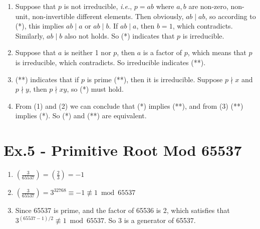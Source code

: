 \documentclass[12pt]{article}
\begin{document}
	\begin{enumerate}
		\item
			Suppose that $p$ is not irreducible, \textit{i.e.}, $p=ab$ where $a,b$ are non-zero, non-unit, non-invertible different elements. Then obviously, $ab\mid ab$, so according to (*), this implies $ab\mid a$ or $ab \mid b$. If $ab \mid a$, then $b=1$, which contradicts. Similarly, $ab \mid b$ also not holds. So (*) indicates that $p$ is irreducible.
		\item
			Suppose that $a$ is neither 1 nor $p$, then $a$ is a factor of $p$, which means that $p$ is irreducible, which contradicts. So irreducible indicates (**).
		\item
			(**) indicates that if $p$ is prime (**), then it is irreducible. Suppose $p\nmid x$ and $p\nmid y$, then $p\nmid xy$, so (*) must hold.
		\item
			From (1) and (2) we can conclude that (*) implies (**), and from (3) (**) implies (*). So (*) and (**) are equivalent.
	\end{enumerate}

\section*{Ex.5 - Primitive Root Mod 65537}

	\begin{enumerate}
		\item
			$(\frac{3}{65537})=(\frac{2}{3})=-1$
		\item
			$(\frac{3}{65537})=3^{32768}\equiv-1\not\equiv1\bmod65537$
		\item
			Since 65537 is prime, and the factor of 65536 is 2, which satisfies that $3^{(65537-1)/2}\not\equiv1\bmod65537$. So 3 is a generator of 65537.
	\end{enumerate}




\end{document}
